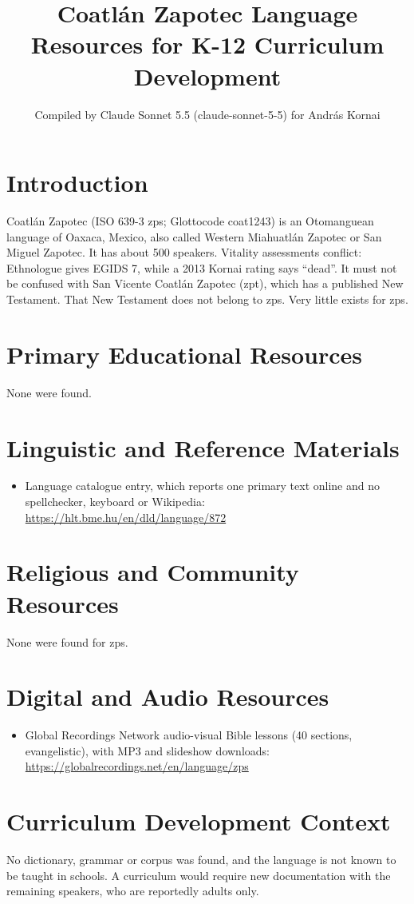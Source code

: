 \documentclass[12pt]{article}
\title{Coatl\'an Zapotec Language Resources for K-12 Curriculum Development}
\author{Compiled by Claude Sonnet 5.5 (claude-sonnet-5-5) for Andr\'as Kornai}
\date{}
\begin{document}
\maketitle

\section{Introduction}
Coatl\'an Zapotec (ISO 639-3 zps; Glottocode coat1243) is an Otomanguean language of Oaxaca, Mexico, also called Western Miahuatl\'an Zapotec or San Miguel Zapotec. It has about 500 speakers. Vitality assessments conflict: Ethnologue gives EGIDS 7, while a 2013 Kornai rating says ``dead''. It must not be confused with San Vicente Coatl\'an Zapotec (zpt), which has a published New Testament. That New Testament does not belong to zps. Very little exists for zps.

\section{Primary Educational Resources}
None were found.

\section{Linguistic and Reference Materials}
\begin{itemize}
\item Language catalogue entry, which reports one primary text online and no spellchecker, keyboard or Wikipedia: \url{https://hlt.bme.hu/en/dld/language/872}
\end{itemize}

\section{Religious and Community Resources}
None were found for zps.

\section{Digital and Audio Resources}
\begin{itemize}
\item Global Recordings Network audio-visual Bible lessons (40 sections, evangelistic), with MP3 and slideshow downloads: \url{https://globalrecordings.net/en/language/zps}
\end{itemize}

\section{Curriculum Development Context}
No dictionary, grammar or corpus was found, and the language is not known to be taught in schools. A curriculum would require new documentation with the remaining speakers, who are reportedly adults only.
\end{document}

